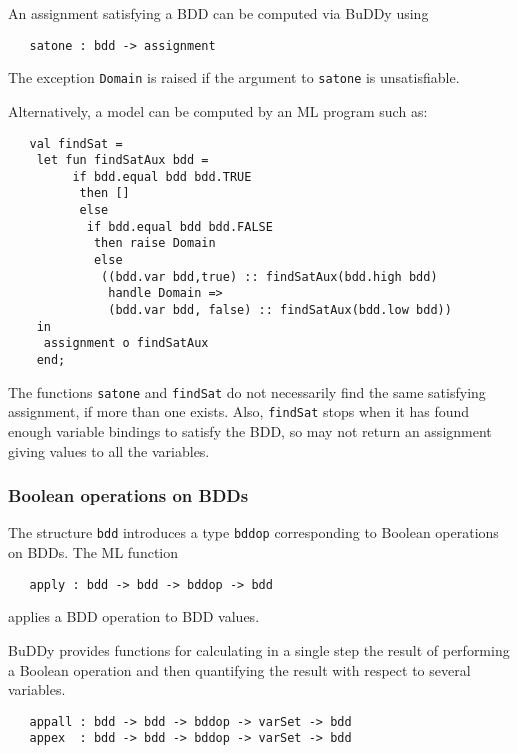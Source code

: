 \documentclass[12pt]{book}
\renewcommand{\t}[1]{\mbox{\tt #1}}
\newcommand{\Buddy}{BuDDy{}}
\begin{document}
An assignment satisfying a BDD can be computed via \Buddy{} using

\begin{verbatim}
   satone : bdd -> assignment
\end{verbatim}

The exception \t{Domain} is raised if the argument to \t{satone} is unsatisfiable.

Alternatively, a model can be computed by an ML program such as:

\begin{verbatim}
   val findSat =
    let fun findSatAux bdd = 
         if bdd.equal bdd bdd.TRUE
          then []
          else
           if bdd.equal bdd bdd.FALSE
            then raise Domain
            else
             ((bdd.var bdd,true) :: findSatAux(bdd.high bdd) 
              handle Domain =>
              (bdd.var bdd, false) :: findSatAux(bdd.low bdd))
    in
     assignment o findSatAux
    end;
\end{verbatim}

The functions \t{satone} and \t{findSat} do not necessarily find the
same satisfying assignment, if more than one exists. Also,
\t{findSat} stops when it has found enough variable bindings to
satisfy the BDD, so may not return an assignment giving values to all
the variables.

\subsubsection{Boolean operations on BDDs}\label{app}

The structure \t{bdd} introduces a type \t{bddop}
corresponding to Boolean operations on BDDs. 
The ML function

\begin{verbatim}
   apply : bdd -> bdd -> bddop -> bdd
\end{verbatim}

applies a BDD operation to BDD values.

\Buddy{} provides functions for calculating in a single step the
result of performing a Boolean operation and then quantifying the
result with respect to several variables.

\begin{verbatim}
   appall : bdd -> bdd -> bddop -> varSet -> bdd
   appex  : bdd -> bdd -> bddop -> varSet -> bdd
\end{verbatim}
\end{document}
